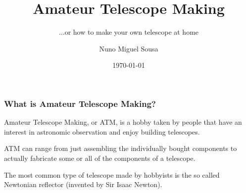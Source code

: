 \documentclass{beamer}
\title{Amateur Telescope Making}
\subtitle{...or how to make your own telescope at home}
\author{Nuno Miguel Sousa}
\institute{Coimbra, Portugal}
\date{\today}
\begin{document}
\begin{frame}
\titlepage
\end{frame}

\begin{frame}
\frametitle{What is Amateur Telescope Making?}
\begin{block}{}
Amateur Telescope Making, or ATM, is a hobby taken by people that have an interest in astronomic observation and enjoy building telescopes.\footnotemark
\end{block}
\begin{block}{}
ATM can range from just assembling the individually bought components to actually fabricate some or all of the components of a telescope.
\end{block}
\begin{block}{}
The most common type of telescope made by hobbyists is the so called Newtonian reflector (invented by Sir Isaac Newton).\footnotemark
\end{block}
\end{frame}

\end{document}
